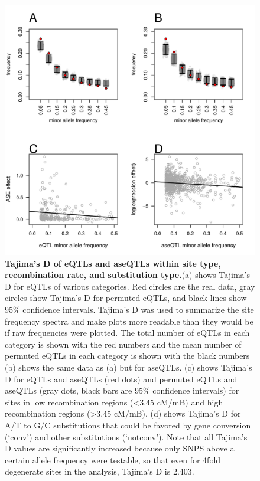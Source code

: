 \begin{figure}[h!]
      \centering
       \includegraphics[width=\linewidth]{Ch3FigS5}
    \caption{\textbf{Tajima’s D of eQTLs and aseQTLs within site type, recombination rate, and substitution type.}(a) shows Tajima’s D for eQTLs of various categories. Red circles are the real data, gray circles show Tajima’s D for permuted eQTLs, and black lines show 95\% confidence intervals. Tajima’s D was used to summarize the site frequency spectra and make plots more readable than they would be if raw frequencies were plotted. The total number of eQTLs in each category is shown with the red numbers and the mean number of permuted eQTLs in each category is shown with the black numbers (b) shows the same data as (a) but for aseQTLs. (c) shows Tajima’s D for eQTLs and aseQTLs (red dots) and permuted eQTLs and aseQTLs (gray dots, black bars are 95\% confidence intervals) for sites in low recombination regions (\textless 3.45 cM/mB) and high recombination regions (\textgreater 3.45 cM/mB). (d) shows Tajima’s D for A/T to G/C substitutions that could be favored by gene conversion (‘conv’) and other substitutions (‘notconv’). Note that all Tajima’s D values are significantly increased because only SNPS above a certain allele frequency were testable, so that even for 4\-fold degenerate sites in the analysis, Tajima’s D is 2.403.}
    \label{fig:3figS5}
\end{figure}

